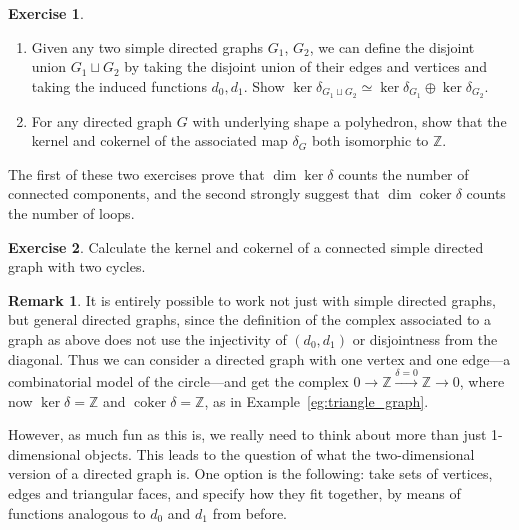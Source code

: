\documentclass{tufte-handout}
\def\ZZ{\mathbb{Z}}
\DeclareMathOperator{\coker}{coker}
\theoremstyle{definition}
\newtheorem{ex}{Exercise}
\newtheorem*{rem}{Remark}
\begin{document}
\begin{ex}
\begin{enumerate}
\item Given any two simple directed graphs $G_1$, $G_2$, we can define the disjoint 
union $G_1 \sqcup G_2$ by taking the disjoint union of their edges and vertices and 
taking the induced functions $d_0, d_1$. Show $\ker \delta_{G_1\sqcup G_2} \simeq \ker 
\delta_{G_1} \oplus \ker \delta_{G_2}$.

\item For any directed graph $G$ with underlying shape a polyhedron, show that the 
kernel and cokernel of the associated map $\delta_G$ both isomorphic to $\ZZ$.
\end{enumerate}
\end{ex}

The first of these two exercises prove that $\dim\ker\delta$ counts the number of 
connected components, and the second strongly suggest that $\dim\coker\delta$ counts the 
number of loops.

\begin{ex}
Calculate the kernel and cokernel of a connected simple directed graph with two cycles.
\end{ex}

\begin{rem}
It is entirely possible to work not just with simple directed graphs, but general directed 
graphs, since the definition of the complex associated to a graph as above does not use the 
injectivity of $(d_0,d_1)$ or disjointness from the diagonal. Thus 
we can consider a directed
graph with one vertex and one edge---a combinatorial model of the circle---and get the complex
$0\to \ZZ \xrightarrow{\delta=0} \ZZ\to 0$, where now $\ker\delta=\ZZ$ and $\coker\delta=\ZZ$,
as in Example~\ref{eg:triangle_graph}.
\end{rem}


However, as much fun as this is, we really need to think about more than just 
1-dimensional objects. This leads to the question of what the two-dimensional version of 
a directed graph is. One option is the following: take sets of vertices, edges and 
triangular faces, and specify how they fit together, by means of functions analogous to 
$d_0$ and $d_1$ from before.
\end{document}

